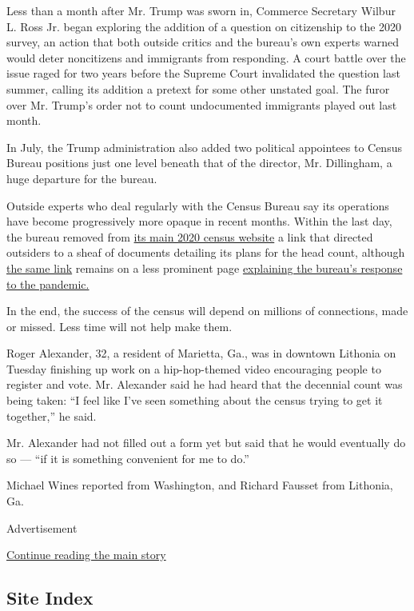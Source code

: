 Less than a month after Mr. Trump was sworn in, Commerce Secretary
Wilbur L. Ross Jr. began exploring the addition of a question on
citizenship to the 2020 survey, an action that both outside critics and
the bureau's own experts warned would deter noncitizens and immigrants
from responding. A court battle over the issue raged for two years
before the Supreme Court invalidated the question last summer, calling
its addition a pretext for some other unstated goal. The furor over Mr.
Trump's order not to count undocumented immigrants played out last
month.

In July, the Trump administration also added two political appointees to
Census Bureau positions just one level beneath that of the director, Mr.
Dillingham, a huge departure for the bureau.

Outside experts who deal regularly with the Census Bureau say its
operations have become progressively more opaque in recent months.
Within the last day, the bureau removed from
\href{https://2020census.gov}{its main 2020 census website} a link that
directed outsiders to a sheaf of documents detailing its plans for the
head count, although
\href{https://www.census.gov/newsroom/press-kits/2019/2020-operations.html?\#}{the
same link} remains on a less prominent page
\href{https://2020census.gov/en/news-events/operational-adjustments-covid-19.html}{explaining
the bureau's response to the pandemic.}

In the end, the success of the census will depend on millions of
connections, made or missed. Less time will not help make them.

Roger Alexander, 32, a resident of Marietta, Ga., was in downtown
Lithonia on Tuesday finishing up work on a hip-hop-themed video
encouraging people to register and vote. Mr. Alexander said he had heard
that the decennial count was being taken: ``I feel like I've seen
something about the census trying to get it together,'' he said.

Mr. Alexander had not filled out a form yet but said that he would
eventually do so --- ``if it is something convenient for me to do.''

Michael Wines reported from Washington, and Richard Fausset from
Lithonia, Ga.

Advertisement

\protect\hyperlink{after-bottom}{Continue reading the main story}

\hypertarget{site-index}{%
\subsection{Site Index}\label{site-index}}

